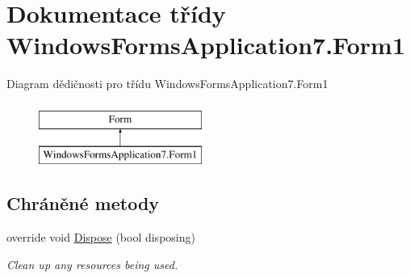 \hypertarget{class_windows_forms_application7_1_1_form1}{}\section{Dokumentace třídy Windows\+Forms\+Application7.\+Form1}
\label{class_windows_forms_application7_1_1_form1}
Diagram dědičnosti pro třídu Windows\+Forms\+Application7.\+Form1\begin{figure}[H]
\begin{center}
\leavevmode
\includegraphics[height=2.000000cm]{class_windows_forms_application7_1_1_form1}
\end{center}
\end{figure}
\subsection*{Chráněné metody}
\begin{DoxyCompactItemize}
\item 
override void \hyperlink{class_windows_forms_application7_1_1_form1_a8a3de7949c73c2d190c437c57d1a514a}{Dispose} (bool disposing)
\begin{DoxyCompactList}\small\item\em Clean up any resources being used. \end{DoxyCompactList}\end{DoxyCompactItemize}

